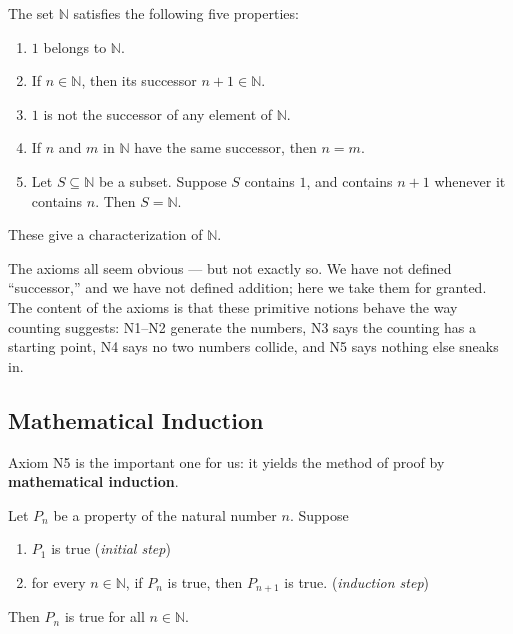 \documentclass[11pt]{report}
\begin{document}
\begin{defbox}
The set $\mathbb{N}$ satisfies the following five properties:
\begin{enumerate}[label=\textbf{N\arabic*.}]
    \item $1$ belongs to $\mathbb{N}$.
    \item If $n \in \mathbb{N}$, then its successor $n+1 \in \mathbb{N}$.
    \item $1$ is not the successor of any element of $\mathbb{N}$.
    \item If $n$ and $m$ in $\mathbb{N}$ have the same successor, then $n = m$.
    \item Let $S \subseteq \mathbb{N}$ be a subset. Suppose $S$ contains $1$, and contains $n+1$ whenever it contains $n$. Then $S = \mathbb{N}$.
\end{enumerate}
These give a characterization of $\mathbb{N}$.
\end{defbox}

\begin{rembox}
The axioms all seem obvious --- but not exactly so. We have not defined ``successor,'' and we have not defined addition; here we take them for granted. The content of the axioms is that these primitive notions behave the way counting suggests: N1--N2 generate the numbers, N3 says the counting has a starting point, N4 says no two numbers collide, and N5 says nothing else sneaks in.
\end{rembox}

\subsection{Mathematical Induction}

Axiom N5 is the important one for us: it yields the method of proof by \textbf{mathematical induction}.

\begin{thmbox}
Let $P_n$ be a property of the natural number $n$. Suppose
\begin{enumerate}[label=(I\arabic*)]
    \item $P_1$ is true \hfill (\emph{initial step})
    \item for every $n \in \mathbb{N}$, if $P_n$ is true, then $P_{n+1}$ is true. \hfill (\emph{induction step})
\end{enumerate}
Then $P_n$ is true for all $n \in \mathbb{N}$.
\end{thmbox}
\end{document}
